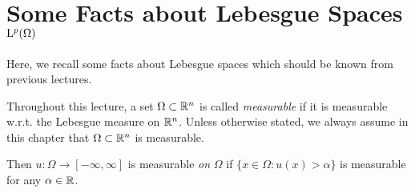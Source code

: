 \chapter{Some Facts about Lebesgue Spaces \texorpdfstring{$\mathrm{L}^p(\Omega)$}{L\textasciicircum p(Omega)}}

Here, we recall some facts about Lebesgue spaces which should be known from previous lectures.

Throughout this lecture, a set $\Omega \subset \mathbb{R}^n$ is called \emph{measurable} if it is measurable w.r.t. the Lebesgue measure on $\mathbb{R}^n$.
Unless otherwise stated, we always assume in this chapter that $\Omega \subset \mathbb{R}^n$ is measurable.

Then $u \colon \Omega \to [-\infty,\infty]$ is measurable \emph{on} $\Omega$ if $\{x \in \Omega \colon u(x) > \alpha\}$ is measurable for any $\alpha \in \mathbb{R}$.

